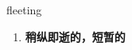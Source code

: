 
\begin{frame}
{\huge fleeting}
\begin{center}
\begin{enumerate}\Large
  \item \textbf{稍纵即逝的，短暂的}
\end{enumerate}
\end{center}
\end{frame}
